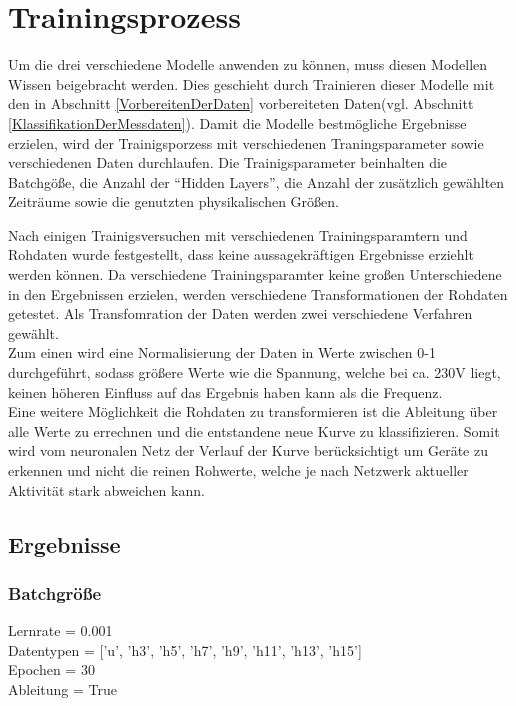 \section{Trainingsprozess}
    Um die drei verschiedene Modelle anwenden zu können, muss diesen Modellen Wissen beigebracht werden.
    Dies geschieht durch Trainieren dieser Modelle mit den in Abschnitt \ref{VorbereitenDerDaten} vorbereiteten Daten(vgl. Abschnitt \ref{KlassifikationDerMessdaten}).
    Damit die Modelle bestmögliche Ergebnisse erzielen, wird der Trainigsporzess mit verschiedenen Traningsparameter sowie verschiedenen Daten durchlaufen.
    Die Trainigsparameter beinhalten die Batchgöße, die Anzahl der "`Hidden Layers"', die Anzahl der zusätzlich gewählten Zeiträume sowie die genutzten physikalischen Größen.
    \newline

    \noindent
    Nach einigen Trainigsversuchen mit verschiedenen Trainingsparamtern und Rohdaten wurde festgestellt, dass keine aussagekräftigen Ergebnisse erziehlt werden können.
    Da verschiedene Trainingsparamter keine großen Unterschiedene in den Ergebnissen erzielen, werden verschiedene Transformationen der Rohdaten getestet.
    Als Transfomration der Daten werden zwei verschiedene Verfahren gewählt. \\
    \noindent
    Zum einen wird eine Normalisierung der Daten in Werte zwischen 0-1 durchgeführt, sodass größere Werte wie die Spannung, welche bei ca. 230V liegt, keinen höheren Einfluss auf das Ergebnis haben kann als die Frequenz.\\
    \noindent
    Eine weitere Möglichkeit die Rohdaten zu transformieren ist die Ableitung über alle Werte zu errechnen und die entstandene neue Kurve zu klassifizieren.
    Somit wird vom neuronalen Netz der Verlauf der Kurve berücksichtigt um Geräte zu erkennen und nicht die reinen Rohwerte, welche je nach Netzwerk aktueller Aktivität stark abweichen kann.
    
    \subsection{Ergebnisse}

    \subsubsection{Batchgröße}

    Lernrate = 0.001\\
    \noindent
    Datentypen = ['u', 'h3', 'h5', 'h7', 'h9', 'h11', 'h13', 'h15']\\
    \noindent
    Epochen = 30\\
    \noindent
    Ableitung = True\\

